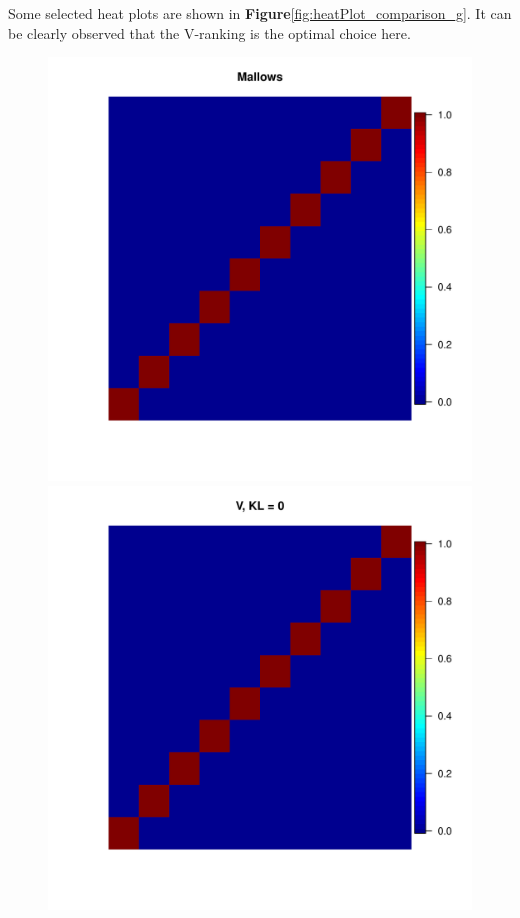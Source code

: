 \documentclass[11pt, oneside]{article}   	%
\begin{document}
Some selected heat plots are shown in \textbf{Figure}\ref{fig:heatPlot_comparison_g}. It can be clearly observed that the V-ranking is the optimal choice here. 
\begin{figure}[h!]

		\begin{minipage}[t]{.45\textwidth}
			\centering
			\includegraphics[width=\textwidth]{figures/theorem2_2/heat_Mallows_N2000n10alpha1run1.pdf}
			
		\end{minipage}
		\hfill
		\begin{minipage}[t]{.45\textwidth}
			\centering
			\includegraphics[width=\textwidth]{figures/theorem2_2/heat_V_N2000n10alpha1run1.pdf}
			

\end{minipage}
\end{figure}
\end{document}
